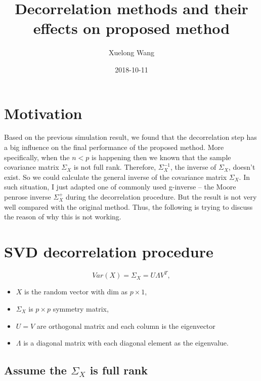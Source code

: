 \documentclass[]{article}
\title{Decorrelation methods and their effects on proposed method}
\author{Xuelong Wang}
\date{2018-10-11}
\providecommand{\tightlist}{%
  \setlength{\itemsep}{0pt}\setlength{\parskip}{0pt}}
\begin{document}
\maketitle

{
\setcounter{tocdepth}{2}
\tableofcontents
}
\section{Motivation}\label{motivation}

Based on the previous simulation result, we found that the decorrelation
step has a big influence on the final performance of the proposed
method. More specifically, when the \(n<p\) is happening then we known
that the sample covariance matrix \(\Sigma_{X}\) is not full rank.
Therefore, \(\Sigma^{-1}_X\), the inverse of \(\Sigma_{X}\), doesn't
exist. So we could calculate the general inverse of the covariance
matrix \(\Sigma_{X}\). In such situation, I just adapted one of commonly
used g-inverse -- the Moore penrose inverse \(\Sigma^{+}_X\) during the
decorrelation procedure. But the result is not very well compared with
the original method. Thus, the following is trying to discuss the reason
of why this is not working.

\section{SVD decorrelation procedure}\label{svd-decorrelation-procedure}

\[
  Var(X) = \Sigma_X = U\Lambda V^T,
\]

\begin{itemize}
\tightlist
\item
  \(X\) is the random vector with dim as \(p \times 1\),\\
\item
  \(\Sigma_X\) is \(p \times p\) symmetry matrix,\\
\item
  \(U = V\) are orthogonal matrix and each column is the eigenvector\\
\item
  \(\Lambda\) is a diagonal matrix with each diagonal element as the
  eigenvalue.
\end{itemize}

\subsection{\texorpdfstring{Assume the \(\Sigma_X\) is full
rank}{Assume the \textbackslash{}Sigma\_X is full rank}}\label{assume-the-sigma_x-is-full-rank}
\end{document}
